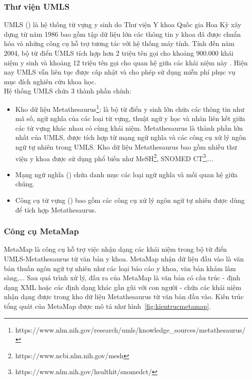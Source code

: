 \subsubsection*{Thư viện UMLS}
UMLS () là hệ thống từ vựng y sinh do Thư viện Y khoa Quốc gia Hoa Kỳ xây dựng từ năm 1986 bao gồm tập dữ liệu lớn các thông tin y khoa đã được chuẩn hóa và những công cụ hỗ trợ tương tác với hệ thống máy tính. Tính đến năm 2004, bộ từ điển UMLS tích hợp hơn 2 triệu tên gọi cho khoảng 900.000 khái niệm y sinh và khoảng 12 triệu tên gọi cho quan hệ giữa các khái niệm này \cite{Bodenreider2004}. Hiện nay UMLS vẫn liên tục được câp nhật và cho phép sử dụng miễn phí phục vụ mục đích nghiên cứu khoa học.\\

Hệ thống UMLS chứa 3 thành phần chính:
\begin{itemize}
\item Kho dữ liệu Metathesaurus\footnote{https://www.nlm.nih.gov/research/umls/knowledge\_sources/metathesaurus/}: là bộ từ điển y sinh lớn chứa các thông tin như mã số, ngữ nghĩa của các loại từ vựng, thuật ngữ y học và nhãn liên kết giữa các từ vựng khác nhau có cùng khái niệm. Metathesaurus là thành phần lớn nhất của UMLS, được tích hợp từ mạng ngữ nghĩa và các công cụ xử lý ngôn ngữ tự nhiên trong UMLS. Kho dữ liệu Metathesaurus bao gồm nhiều thư viện y khoa được sử dụng phổ biến như MeSH\footnote{https://www.ncbi.nlm.nih.gov/mesh}, SNOMED CT\footnote{https://www.nlm.nih.gov/healthit/snomedct/},...
\item Mạng ngữ nghĩa () chứa danh mục các loại ngữ nghĩa và mối quan hệ giữa chúng.
\item Công cụ từ vựng () bao gồm các công cụ xử lý ngôn ngữ tự nhiên được dùng để tích hợp Metathesaurus.
\end{itemize}

\subsubsection*{Công cụ MetaMap}
MetaMap là công cụ hỗ trợ việc nhận dạng các khái niệm trong bộ từ điển UMLS-Metathesaurus từ văn bản y khoa. MetaMap nhận dữ liệu đầu vào là văn bản thuần ngôn ngữ tự nhiên như các loại báo cáo y khoa, văn bản khám lâm sàng,... Sau quá trình xử lý, đầu ra của MetaMap là văn bản có cấu trúc - định dạng XML hoặc các định dạng khác gần gũi với con người - chứa các khái niệm nhận dạng được trong kho dữ liệu Metathesaurus từ văn bản đầu vào. Kiến trúc tổng quát của MetaMap được mô tả như hình~\ref{fig:kientrucmetamap}.\\

